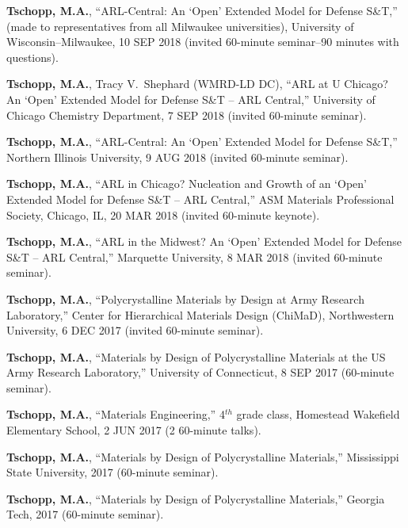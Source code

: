 \begin{cvlist}
\item
\textbf{Tschopp, M.A.}, ``ARL-Central: An `Open' Extended Model for Defense S\&T,'' (made to representatives from all Milwaukee universities), University of Wisconsin--Milwaukee, 10 SEP 2018  (invited 60-minute seminar--90 minutes with questions).

\item
\textbf{Tschopp, M.A.}, Tracy V.~Shephard (WMRD-LD DC), ``ARL at U Chicago? An `Open' Extended Model for Defense S\&T -- ARL Central,'' University of Chicago Chemistry Department,  7 SEP 2018  (invited 60-minute seminar).

\item
\textbf{Tschopp, M.A.}, ``ARL-Central: An `Open' Extended Model for Defense S\&T,'' Northern Illinois University, 9 AUG 2018  (invited 60-minute seminar).

\item
\textbf{Tschopp, M.A.}, ``ARL in Chicago?  Nucleation and Growth of an `Open' Extended Model for Defense S\&T -- ARL Central,'' ASM Materials Professional Society, Chicago, IL, 20 MAR 2018 (invited 60-minute keynote).

\item
\textbf{Tschopp, M.A.}, ``ARL in the Midwest?  An `Open' Extended Model for Defense S\&T -- ARL Central,'' Marquette University, 8 MAR 2018  (invited 60-minute seminar).

\item
\textbf{Tschopp, M.A.}, ``Polycrystalline Materials by Design at Army Research Laboratory,'' Center for Hierarchical Materials Design (ChiMaD), Northwestern University, 6 DEC 2017 (invited 60-minute seminar).

\item
\textbf{Tschopp, M.A.}, ``Materials by Design of Polycrystalline Materials at the US Army Research Laboratory,'' University of Connecticut, 8 SEP 2017 (60-minute seminar).

\item
\textbf{Tschopp, M.A.}, ``Materials Engineering,'' 4$^{th}$ grade class, Homestead Wakefield Elementary School, 2 JUN 2017 (2 60-minute talks).

\item
\textbf{Tschopp, M.A.}, ``Materials by Design of Polycrystalline Materials,'' Mississippi State University, 2017 (60-minute seminar).

\item
\textbf{Tschopp, M.A.}, ``Materials by Design of Polycrystalline Materials,'' Georgia Tech, 2017 (60-minute seminar).


\end{cvlist}
